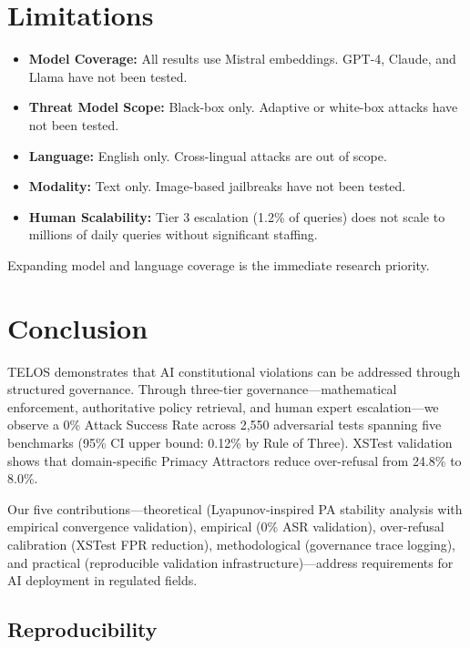 \documentclass[11pt,twocolumn]{article}
\begin{document}
\section{Limitations}

\begin{itemize}
    \item \textbf{Model Coverage:} All results use Mistral embeddings. GPT-4, Claude, and Llama have not been tested.
    \item \textbf{Threat Model Scope:} Black-box only. Adaptive or white-box attacks have not been tested.
    \item \textbf{Language:} English only. Cross-lingual attacks are out of scope.
    \item \textbf{Modality:} Text only. Image-based jailbreaks have not been tested.
    \item \textbf{Human Scalability:} Tier 3 escalation (1.2\% of queries) does not scale to millions of daily queries without significant staffing.
\end{itemize}

Expanding model and language coverage is the immediate research priority.

\section{Conclusion}

TELOS demonstrates that AI constitutional violations can be addressed through structured governance. Through three-tier governance---mathematical enforcement, authoritative policy retrieval, and human expert escalation---we observe a 0\% Attack Success Rate across 2,550 adversarial tests spanning five benchmarks (95\% CI upper bound: 0.12\% by Rule of Three). XSTest validation shows that domain-specific Primacy Attractors reduce over-refusal from 24.8\% to 8.0\%.

Our five contributions---theoretical (Lyapunov-inspired PA stability analysis with empirical convergence validation), empirical (0\% ASR validation), over-refusal calibration (XSTest FPR reduction), methodological (governance trace logging), and practical (reproducible validation infrastructure)---address requirements for AI deployment in regulated fields.

\subsection{Reproducibility}
\end{document}
